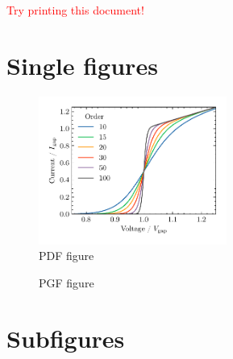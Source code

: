 \documentclass[11pt]{amsart}
\begin{document}
\begin{center}
\textcolor{red}{\huge Try printing this document!}
\end{center}

\section{Single figures}

\begin{figure}[h!]
\centering 
\includegraphics[width=0.55\textwidth]{../figures/fig1.pdf}
\caption{PDF figure}
\end{figure}

\begin{figure}[h!]
\centering 

\caption{PGF figure}
\end{figure}




\newpage
\section{Subfigures}
\end{document}
